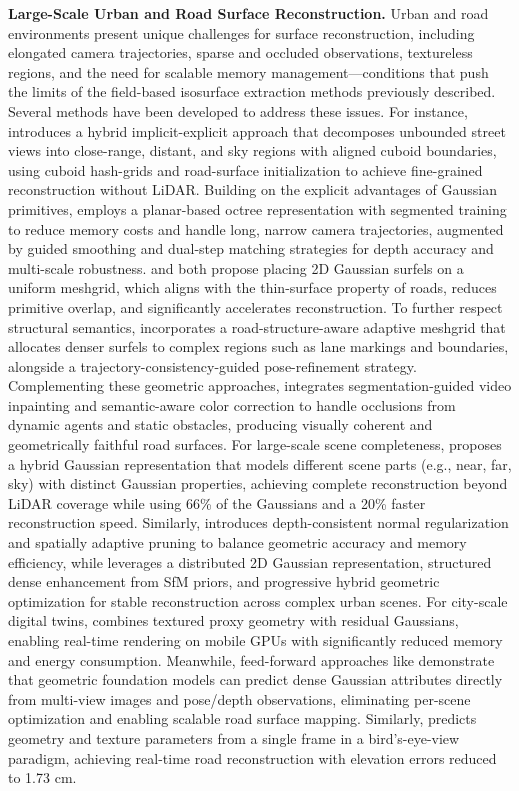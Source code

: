 \documentclass[11pt]{article}
\begin{document}
\textbf{Large-Scale Urban and Road Surface Reconstruction.} Urban and road environments present unique challenges for surface reconstruction, including elongated camera trajectories, sparse and occluded observations, textureless regions, and the need for scalable memory management---conditions that push the limits of the field-based isosurface extraction methods previously described. Several methods have been developed to address these issues. For instance, \cite{ref219} introduces a hybrid implicit-explicit approach that decomposes unbounded street views into close-range, distant, and sky regions with aligned cuboid boundaries, using cuboid hash-grids and road-surface initialization to achieve fine-grained reconstruction without LiDAR. Building on the explicit advantages of Gaussian primitives, \cite{ref220} employs a planar-based octree representation with segmented training to reduce memory costs and handle long, narrow camera trajectories, augmented by guided smoothing and dual-step matching strategies for depth accuracy and multi-scale robustness. \cite{ref221} and \cite{ref222} both propose placing 2D Gaussian surfels on a uniform meshgrid, which aligns with the thin-surface property of roads, reduces primitive overlap, and significantly accelerates reconstruction. To further respect structural semantics, \cite{ref221} incorporates a road-structure-aware adaptive meshgrid that allocates denser surfels to complex regions such as lane markings and boundaries, alongside a trajectory-consistency-guided pose-refinement strategy. Complementing these geometric approaches, \cite{ref223} integrates segmentation-guided video inpainting and semantic-aware color correction to handle occlusions from dynamic agents and static obstacles, producing visually coherent and geometrically faithful road surfaces. For large-scale scene completeness, \cite{ref224} proposes a hybrid Gaussian representation that models different scene parts (e.g., near, far, sky) with distinct Gaussian properties, achieving complete reconstruction beyond LiDAR coverage while using 66\% of the Gaussians and a 20\% faster reconstruction speed. Similarly, \cite{ref225} introduces depth-consistent normal regularization and spatially adaptive pruning to balance geometric accuracy and memory efficiency, while \cite{ref226} leverages a distributed 2D Gaussian representation, structured dense enhancement from SfM priors, and progressive hybrid geometric optimization for stable reconstruction across complex urban scenes. For city-scale digital twins, \cite{ref227} combines textured proxy geometry with residual Gaussians, enabling real-time rendering on mobile GPUs with significantly reduced memory and energy consumption. Meanwhile, feed-forward approaches like \cite{ref228} demonstrate that geometric foundation models can predict dense Gaussian attributes directly from multi-view images and pose/depth observations, eliminating per-scene optimization and enabling scalable road surface mapping. Similarly, \cite{ref229} predicts geometry and texture parameters from a single frame in a bird's-eye-view paradigm, achieving real-time road reconstruction with elevation errors reduced to 1.73 cm.
\end{document}
